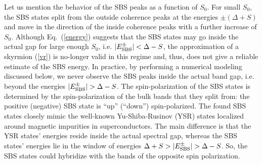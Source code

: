 \documentclass[twocolumn,showpacs,floatfix,longbibliography]{revtex4-1}
\begin{document}
Let us mention the behavior of the SBS peaks as a function of $S_0$. For small $S_0$, the SBS states split from the outside coherence peaks at the energies $\pm (\Delta+S)$ and move in the direction of the inside coherence peaks with a further increase of $S_0$. Although Eq.~(\ref{energy}) suggests that the SBS states may go inside the actual gap for large enough  $S_0$, i.e. $|E^\pm_{\rm SBS}|<\Delta-S$, the approximation of a skyrmion (\ref{vr}) is no-longer valid in this regime and, thus, does not give a reliable estimate of the SBS energy. In practice, by performing a numerical modeling discussed below, we never observe the SBS peaks inside the actual band gap, i.e. beyond the energies $|E^\pm_{\rm SBS}|>\Delta-S$. The spin-polarization of the SBS states is determined by the spin-polarization of the bulk bands that they split from: the positive (negative) SBS state is ``up'' (``down'') spin-polarized. The found SBS states closely mimic the well-known Yu-Shiba-Rusinov (YSR) states \cite{Yu,Shiba,Rusinov,Balatsky2006} localized around magnetic impurities in superconductors. The main difference is that the YSR states' energies reside inside the actual spectral gap, whereas the SBS states' energies lie in the window of energies $\Delta+S>|E^\pm_{\rm SBS}|>\Delta-S$. So, the SBS states could hybridize with the bands of the opposite spin polarization.  
\end{document}
